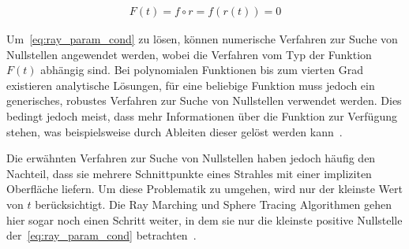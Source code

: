 \begin{gather}\label{eq:ray_param_cond}
    F(t) = f \circ r = f(r(t)) = 0
\end{gather}

Um~\autoref{eq:ray_param_cond} zu lösen, können numerische
Verfahren zur Suche von Nullstellen angewendet werden, wobei die Verfahren
vom Typ der Funktion $F(t)$ abhängig sind. Bei polynomialen Funktionen
bis zum vierten Grad existieren analytische Lösungen, für eine beliebige
Funktion muss jedoch ein generisches, robustes Verfahren zur
Suche von Nullstellen verwendet werden. Dies bedingt jedoch meist, dass mehr
Informationen über die Funktion zur Verfügung stehen, was beispielsweise
durch Ableiten dieser gelöst werden kann~\parencite[S.
528]{hart_sphere_1994}.

Die erwähnten Verfahren zur Suche von Nullstellen haben jedoch häufig den
Nachteil, dass sie mehrere Schnittpunkte eines Strahles mit einer
impliziten Oberfläche liefern. Um diese Problematik zu umgehen, wird nur
der kleinste Wert von $t$ berücksichtigt. Die Ray Marching und Sphere
Tracing Algorithmen gehen hier sogar noch einen Schritt weiter, in dem
sie nur die kleinste positive Nullstelle der~\autoref{eq:ray_param_cond}
betrachten~\parencite[S. 528]{hart_sphere_1994}.





